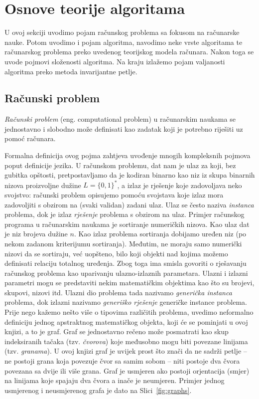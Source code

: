 \chapter{Osnove teorije algoritama}
  U ovoj sekciji uvodimo pojam računskog problema sa fokusom na računarske nauke. Potom uvodimo i pojam algoritma, navodimo neke vrste algoritama te računarskog problema preko uvedenog teorijskog modela računara. Nakon toga se uvode pojmovi složenosti algoritma. Na kraju izlažemo pojam valjanosti algoritma preko metoda invarijantne petlje.  
   
\section{Računski problem}

\textit{Računski problem} (eng. computational problem) u računarskim naukama se jednostavno i slobodno može definisati kao zadatak koji je potrebno riješiti uz pomoć računara. 

Formalna definicija ovog pojma zahtjeva uvođenje mnogih kompleksnih pojmova poput definicije jezika.  U računskom problemu, dat nam je ulaz za koji, bez gubitka opštosti, pretpostavljamo da je kodiran  binarno kao niz iz skupa binarnih nizova proizvoljne dužine $L=\{0, 1\}^*$, a  izlaz je 
rješenje koje zadovoljava neko svojstvo: računski problem  opisujemo  pomoću svojstava koje izlaz mora zadovoljiti s obzirom na (svaki validan) zadani ulaz. Ulaz se često naziva \textit{instanca} problema, dok je izlaz \textit{rješenje} problema s obzirom na ulaz. Primjer računskog programa u računarskim naukama je sortiranje numeričkih nizova. Kao ulaz dat je niz brojeva dužine $n$. Kao izlaz problema sortiranja dobijamo uređen niz (po nekom zadanom kriterijumu sortiranja). Međutim, ne moraju samo numerički nizovi da se sortiraju, već uopšteno, bilo koji objekti nad kojima možemo definisati relaciju totalnog uređenja. Zbog toga ima smisla govoriti o rješavanju računskog problema kao 
 uparivanju ulazno-izlaznih parametara. Ulazni i izlazni parametri mogu se predstaviti nekim matematičkim objektima kao što su brojevi, skupovi, nizovi itd. Ulazni dio problema tada nazivamo \textit{generička instanca} problema, dok izlazni nazivamo  \textit{generiško rješenje} generičke instance problema.      
 Prije nego kažemo nešto više o tipovima različitih problema, uvedimo neformalno definiciju jednog apstraktnog matematičkog objekta, koji će se pominjati u ovoj knjizi, a to je graf. Graf se jednostavno rečeno može posmatrati kao skup indeksiranih tačaka (tzv. \textit{čvorova}) koje međusobno mogu biti povezane linijama (tzv. \textit{granama}). U ovoj knjizi graf je uvijek prost što znači da ne sadrži petlje -- ne postoji grana koja povezuje čvor sa samim sobom -- niti postoje dva čvora povezana sa dvije ili više grana. Graf je usmjeren ako postoji orjentacija (smjer) na linijama koje spajaju dva čvora a inače je neumjeren. Primjer jednog usmjerenog i neusmjerenog grafa je dato na Slici~\ref{fig:graphs}. 
 
